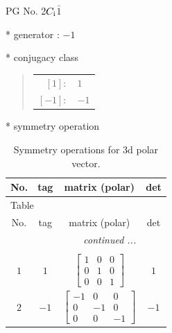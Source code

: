 \documentclass[fleqn,8pt]{jsarticle}
\begin{document}
\setcounter{MaxMatrixCols}{32}

\renewcommand{\tablename}{Table~}
\renewcommand{\figurename}{Figure~}
\begin{center}
\LARGE
PG No. 2\quad$C_{\rm i}$\quad$\bar{1}$\quad[ triclinic ]
\end{center}

* generator : $-1$

* conjugacy class
\begin{quote}
\begin{tabular}{rl}
$ [1]: $ & $ 1 $ \\
$ [-1]: $ & $ -1 $
\end{tabular}
\end{quote}

* symmetry operation
\renewcommand{\arraystretch}{1.3}
\begin{longtable}{cccc}
\caption{Symmetry operations for 3d polar vector.}
 \\
 \hline \hline
No. & tag & matrix (polar) & det \\ \hline \endfirsthead

\multicolumn{3}{l}{\tablename\ \thetable{}} \\
 \hline \hline
No. & tag & matrix (polar) & det \\ \hline \endhead

 \hline \hline
\multicolumn{3}{r}{\footnotesize\it continued ...} \\ \endfoot

 \hline \hline
\multicolumn{3}{r}{} \\ \endlastfoot

$ 1 $ & $ 1 $ & $ \begin{bmatrix} 1 & 0 & 0 \\ 0 & 1 & 0 \\ 0 & 0 & 1 \end{bmatrix} $ & $ 1 $ \\ \hline
$ 2 $ & $ -1 $ & $ \begin{bmatrix} -1 & 0 & 0 \\ 0 & -1 & 0 \\ 0 & 0 & -1 \end{bmatrix} $ & $ -1 $ \\
\end{longtable}
\end{document}
